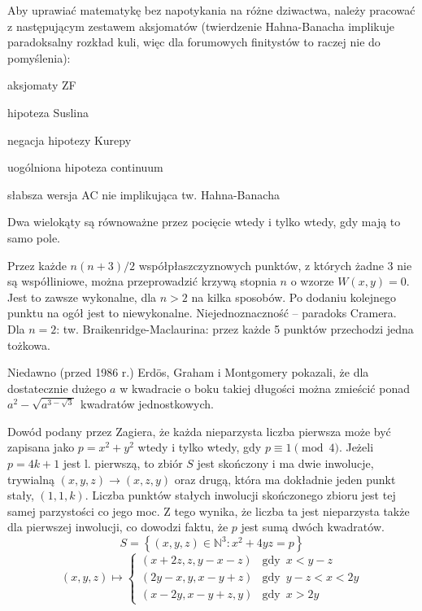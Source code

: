 \begin{parnumbers}
\begin{fkt}Aby uprawiać matematykę bez napotykania na różne dziwactwa, należy pracować z następującym zestawem aksjomatów (twierdzenie Hahna-Banacha implikuje paradoksalny rozkład kuli, więc dla forumowych finitystów to raczej nie do pomyślenia): \begin{itemx}\item aksjomaty ZF \item hipoteza Suslina \item negacja hipotezy Kurepy \item uogólniona hipoteza continuum \item słabsza wersja AC nie implikująca tw. Hahna-Banacha\end{itemx}\end{fkt}

\begin{fkt} Dwa wielokąty są równoważne przez pocięcie wtedy i tylko wtedy, gdy mają to samo pole.\end{fkt}

\begin{fkt} Przez każde $n(n+3)/2$ współpłaszczyznowych punktów, z których żadne $3$ nie są współliniowe, można przeprowadzić krzywą stopnia $n$ o wzorze $W(x,y) = 0$. Jest to zawsze wykonalne, dla $n > 2$ na kilka sposobów. Po dodaniu kolejnego punktu na ogół jest to niewykonalne. Niejednoznaczność -- paradoks Cramera. Dla $n = 2$: tw. Braikenridge-Maclaurina: przez każde 5 punktów przechodzi jedna tożkowa.\end{fkt}

\begin{fkt}Niedawno (przed 1986 r.) Erdös, Graham i Montgomery pokazali, że dla dostatecznie dużego $a$ w kwadracie o boku takiej długości można zmieścić ponad $a^2 - \sqrt{a^{3-\sqrt{3}}}$ kwadratów jednostkowych.\end{fkt}



\begin{fkt}Dowód podany przez Zagiera, że każda nieparzysta liczba pierwsza może być zapisana jako $p = x^2+y^2$ wtedy i tylko wtedy, gdy $p \equiv 1 \pmod 4$. Jeżeli $p = 4k+1$ jest l. pierwszą, to zbiór $S$ jest skończony i ma dwie inwolucje, trywialną $(x,y,z) \rightarrow (x,z,y)$ oraz drugą, która ma dokładnie jeden punkt stały, $(1,1,k)$. Liczba punktów stałych inwolucji skończonego zbioru jest tej samej parzystości co jego moc. Z tego wynika, że liczba ta jest nieparzysta także dla pierwszej inwolucji, co dowodzi faktu, że $p$ jest sumą dwóch kwadratów. 
$$S= \left\{(x,y,z) \in \mathbb N^3 : x^2 + 4yz = p\right\}$$ 
$$(x,y,z)\mapsto
\begin{cases}
(x+2z, z, y-x-z) & \textrm{gdy}\,\,\, x < y-z \\
(2y-x, y, x-y+z) & \textrm{gdy}\,\,\, y-z < x < 2y\\
(x-2y, x-y+z, y) & \textrm{gdy}\,\,\, x > 2y
\end{cases}$$ 
\end{fkt}


\end{parnumbers}
